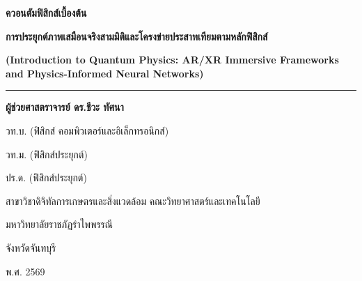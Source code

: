 \begin{titlepage}
    \centering
    \vspace*{1.2cm}
    
    {\Huge\bfseries\color{darkNavy} ควอนตัมฟิสิกส์เบื้องต้น \par}
    \vspace{0.4cm}
    {\LARGE\bfseries\color{cyberBlue} การประยุกต์ภาพเสมือนจริงสามมิติและโครงข่ายประสาทเทียมตามหลักฟิสิกส์ \par}
    \vspace{0.35cm}
    {\large\bfseries\color{neonPurple} (Introduction to Quantum Physics: AR/XR Immersive Frameworks and Physics-Informed Neural Networks) \par}
    
    \vspace{1.2cm}
    {\color{quantumGold}\rule{0.85\textwidth}{2pt}}
    \vspace{1.2cm}
    
    {\Large\textbf{ผู้ช่วยศาสตราจารย์ ดร.ชีวะ ทัศนา}\par}
    \vspace{0.35cm}
    {\large วท.บ. (ฟิสิกส์ คอมพิวเตอร์และอิเล็กทรอนิกส์)\par}
    \vspace{0.15cm}
    {\large วท.ม. (ฟิสิกส์ประยุกต์)\par}
    \vspace{0.15cm}
    {\large ปร.ด. (ฟิสิกส์ประยุกต์)\par}
    
    \vfill
    
    {\large สาขาวิชาดิจิทัลการเกษตรและสิ่งแวดล้อม คณะวิทยาศาสตร์และเทคโนโลยี\par}
    \vspace{0.2cm}
    {\large มหาวิทยาลัยราชภัฏรำไพพรรณี\par}
    \vspace{0.2cm}
    {\large จังหวัดจันทบุรี\par}
    \vspace{0.6cm}
    {\large พ.ศ. 2569\par}
\end{titlepage}
